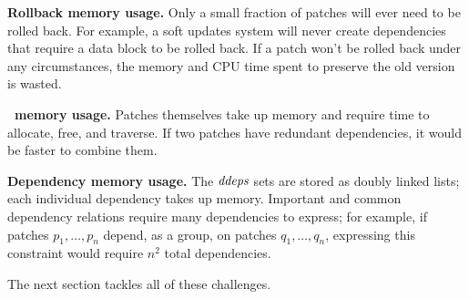\textbf{Rollback memory usage.}
%
Only a small fraction of patches will ever need to be rolled back.
%
For example, a soft updates system will never create dependencies that
require a data block to be rolled back.
%
If a patch won't be rolled back under any circumstances, the memory and
CPU time spent to preserve the old version is wasted.


\textbf{\Patch\ memory usage.}
%
Patches themselves take up memory and require time to allocate, free, and
traverse.
%
If two patches have redundant dependencies, it would be faster to combine
them.


\textbf{Dependency memory usage.}
%
The $\PDDepset{}$ sets are stored as doubly linked lists; each individual
dependency takes up memory.
%
Important and common dependency relations require many dependencies to
express; for example, if patches $p_1,\dots,p_n$ depend, as a group, on
patches $q_1,\dots,q_n$, expressing this constraint would require $n^2$
total dependencies.


The next section tackles all of these challenges.
